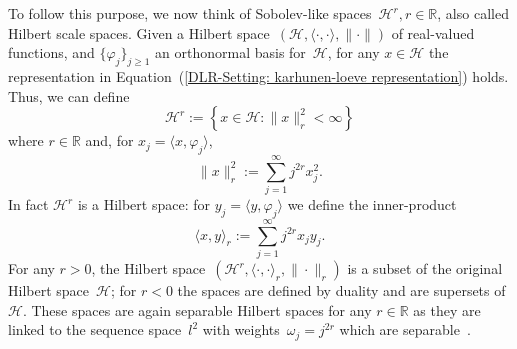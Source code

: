 To follow this purpose, we now think of Sobolev-like spaces~$\mathcal{H}^r , r \in \mathbb{R}$, also called Hilbert scale spaces. Given a Hilbert space~$ (\mathcal{H}, \langle \cdot, \cdot \rangle, \| \cdot \|) $ of real-valued functions, and  $\{ \varphi_j \}_{j \geq 1}$ an orthonormal basis for~$\mathcal{H}$, for any $x \in \mathcal{H}$ the representation in Equation~(\ref{DLR-Setting: karhunen-loeve representation}) holds. Thus, we can define
\begin{equation}
 \mathcal{H}^r := \left\{ x \in \mathcal{H}: \| x \|_r^2 < \infty \right\}
\end{equation}
where $r \in \mathbb{R}$ and, for $ x_j = \langle x, \varphi_j \rangle $,
\begin{equation}
\label{DLR-Setting: H^r norm}
 \| x \|_r^2 := \sum_{j=1}^{\infty} j^{2r} x_j^2.
\end{equation}
In fact $\mathcal{H}^r$ is a Hilbert space: for $ y_j = \langle y, \varphi_j \rangle $ we define the inner-product
\begin{equation}
 \langle x, y \rangle_{r} := \sum_{j=1}^{\infty} j^{2r} x_j y_j.
\end{equation}
For any $r>0$, the Hilbert space~$ (\mathcal{H}^r, \langle \cdot, \cdot \rangle_r, \| \cdot \|_r) $ is a subset of the original Hilbert space~$\mathcal{H}$; for $r<0$ the spaces are defined by duality and are supersets of $\mathcal{H}$. These spaces are again separable Hilbert spaces for any $r \in \mathbb{R}$ as they are linked to the sequence space~$l^2$ with weights~$\omega_j = j^{2r}$ which are separable~\autocite[Section 6.1.3]{Dashti2014}.

